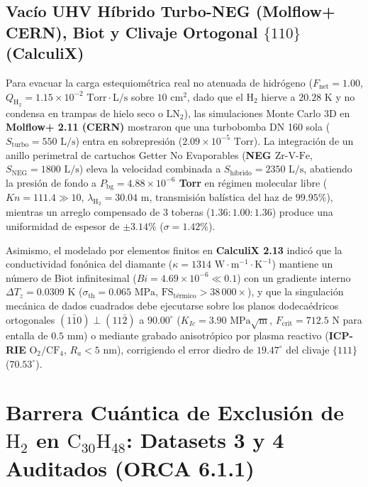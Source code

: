 \documentclass[10pt,twocolumn,a4paper]{article}
\begin{document}
\subsection{Vacío UHV Híbrido Turbo-NEG (Molflow+ CERN), Biot y Clivaje Ortogonal $\{110\}$ (CalculiX)}
Para evacuar la carga estequiométrica real no atenuada de hidrógeno ($F_{\text{net}} = 1.00$, $Q_{\text{H}_2} = 1.15 \times 10^{-2}\text{ Torr}\cdot\text{L/s}$ sobre $10\text{ cm}^2$, dado que el $\text{H}_2$ hierve a $20.28\text{ K}$ y no condensa en trampas de hielo seco o $\text{LN}_2$), las simulaciones Monte Carlo 3D en \textbf{Molflow+ 2.11 (CERN)} \cite{Kersevan2009} mostraron que una turbobomba DN 160 sola ($S_{\text{turbo}} = 550\text{ L/s}$) entra en sobrepresión ($2.09 \times 10^{-5}\text{ Torr}$). La integración de un anillo perimetral de cartuchos Getter No Evaporables (\textbf{NEG $\text{Zr-V-Fe}$}, $S_{\text{NEG}} = 1800\text{ L/s}$) eleva la velocidad combinada a $S_{\text{híbrido}} = 2350\text{ L/s}$, abatiendo la presión de fondo a \textbf{$P_{\text{bg}} = 4.88 \times 10^{-6}$ Torr} en régimen molecular libre (\textbf{$Kn = 111.4 \gg 10$}, $\lambda_{\text{H}_2} = 30.04\text{ m}$, transmisión balística del haz de $99.95\%$), mientras un arreglo compensado de $3$ toberas ($1.36 : 1.00 : 1.36$) produce una uniformidad de espesor de $\pm 3.14\%$ ($\sigma = 1.42\%$).

Asimismo, el modelado por elementos finitos en \textbf{CalculiX 2.13} \cite{Dhondt2018} indicó que la conductividad fonónica del diamante ($\kappa = 1314\text{ W}\cdot\text{m}^{-1}\cdot\text{K}^{-1}$) mantiene un número de Biot infinitesimal (\textbf{$Bi = 4.69 \times 10^{-6} \ll 0.1$}) con un gradiente interno $\Delta T_z = 0.0309\text{ K}$ ($\sigma_{\text{th}} = 0.065\text{ MPa}$, $\text{FS}_{\text{térmico}} > 38\,000\times$), y que la singulación mecánica de dados cuadrados debe ejecutarse sobre los planos dodecaédricos ortogonales $(1\bar{1}0) \perp (11\bar{2})$ a \textbf{$90.00^\circ$} ($K_{Ic} = 3.90\text{ MPa}\sqrt{\text{m}}$, $F_{\text{crit}} = 712.5\text{ N}$ para entalla de $0.5\text{ mm}$) o mediante grabado anisotrópico por plasma reactivo (\textbf{ICP-RIE} $\text{O}_2/\text{CF}_4$, $R_a < 5\text{ nm}$), corrigiendo el error diedro de $19.47^\circ$ del clivaje $\{111\}$ ($70.53^\circ$).

\section{Barrera Cuántica de Exclusión de $\text{H}_2$ en $\text{C}_{30}\text{H}_{48}$: Datasets 3 y 4 Auditados (ORCA 6.1.1)}
\end{document}
